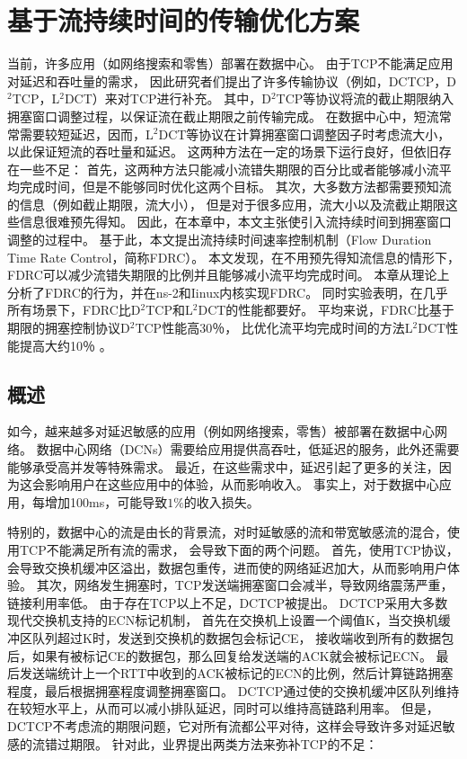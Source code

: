 \chapter{基于流持续时间的传输优化方案}
\label{chapter:FDRC}
当前，许多应用（如网络搜索和零售）部署在数据中心。
由于TCP不能满足应用对延迟和吞吐量的需求，
因此研究者们提出了许多传输协议（例如，DCTCP，D$^2$TCP，L$^2$DCT）来对TCP进行补充。
其中，D$^2$TCP等协议将流的截止期限纳入拥塞窗口调整过程，以保证流在截止期限之前传输完成。
在数据中心中，短流常常需要较短延迟，因而，L$^2$DCT等协议在计算拥塞窗口调整因子时考虑流大小，以此保证短流的吞吐量和延迟。
这两种方法在一定的场景下运行良好，但依旧存在一些不足：
首先，这两种方法只能减小流错失期限的百分比或者能够减小流平均完成时间，但是不能够同时优化这两个目标。
其次，大多数方法都需要预知流的信息（例如截止期限，流大小），
但是对于很多应用，流大小以及流截止期限这些信息很难预先得知。
因此，在本章中，本文主张使引入流持续时间到拥塞窗口调整的过程中。
基于此，本文提出流持续时间速率控制机制（Flow Duration Time Rate Control，简称FDRC）。
本文发现，在不用预先得知流信息的情形下，FDRC可以减少流错失期限的比例并且能够减小流平均完成时间。
本章从理论上分析了FDRC的行为，并在ns-2和Iinux内核实现FDRC。
同时实验表明，在几乎所有场景下，FDRC比D$^2$TCP和L$^2$DCT的性能都要好。
平均来说，FDRC比基于期限的拥塞控制协议D$^2$TCP性能高30％，
比优化流平均完成时间的方法L$^2$DCT性能提高大约10％ 。

\section{概述}
\label{FDRC:introduction}
如今，越来越多对延迟敏感的应用（例如网络搜索，零售）被部署在数据中心网络。
数据中心网络（DCNs）需要给应用提供高吞吐，低延迟的服务，此外还需要能够承受高并发等特殊需求。
最近，在这些需求中，延迟引起了更多的关注，因为这会影响用户在这些应用中的体验，从而影响收入。
事实上，对于数据中心应用，每增加100ms，可能导致$1\%$的收入损失\cite{DCTCP,LPD}。


特别的，数据中心的流是由长的背景流，对时延敏感的流和带宽敏感流的混合，使用TCP不能满足所有流的需求，
会导致下面的两个问题。
首先，使用TCP协议，会导致交换机缓冲区溢出，数据包重传，进而使的网络延迟加大，从而影响用户体验。
其次，网络发生拥塞时，TCP发送端拥塞窗口会减半，导致网络震荡严重，链接利用率低。
由于存在TCP以上不足，DCTCP\cite{DCTCP}被提出。 
DCTCP采用大多数现代交换机支持的ECN标记机制\cite{DCTCP}，
首先在交换机上设置一个阈值K，当交换机缓冲区队列超过K时，发送到交换机的数据包会标记CE，
接收端收到所有的数据包后，如果有被标记CE的数据包，那么回复给发送端的ACK就会被标记ECN。
最后发送端统计上一个RTT中收到的ACK被标记的ECN的比例，然后计算链路拥塞程度，最后根据拥塞程度调整拥塞窗口。
DCTCP通过使的交换机缓冲区队列维持在较短水平上，从而可以减小排队延迟，同时可以维持高链路利用率。
但是，DCTCP不考虑流的期限问题，它对所有流都公平对待，这样会导致许多对延迟敏感的流错过期限\cite{D2TCP,D3}。
针对此，业界提出两类方法来弥补TCP的不足：

